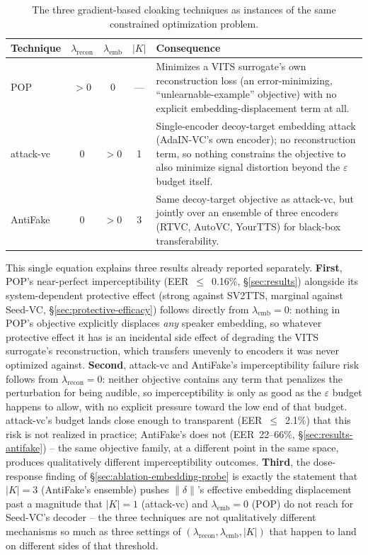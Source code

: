 \documentclass[11pt]{article}
\begin{document}
\begin{table}[H]
\centering
\caption{The three gradient-based cloaking techniques as instances of
the same constrained optimization problem.}
\label{tab:framework-cloaks}
\begin{tabular}{lccc p{4.3cm}}
\toprule
Technique & $\lambda_{\mathrm{recon}}$ & $\lambda_{\mathrm{emb}}$ & $|K|$ & Consequence \\
\midrule
POP       & $>0$ & $0$ & --- & Minimizes a VITS surrogate's own
  reconstruction loss (an error-minimizing, ``unlearnable-example''
  objective) with no explicit embedding-displacement term at all. \\
attack-vc & $0$   & $>0$ & 1 & Single-encoder decoy-target embedding
  attack (AdaIN-VC's own encoder); no reconstruction term, so nothing
  constrains the objective to also minimize signal distortion beyond
  the $\varepsilon$ budget itself. \\
AntiFake  & $0$   & $>0$ & 3 & Same decoy-target objective as
  attack-vc, but jointly over an ensemble of three encoders (RTVC,
  AutoVC, YourTTS) for black-box transferability. \\
\bottomrule
\end{tabular}
\end{table}

This single equation explains three results already reported
separately. \textbf{First}, POP's near-perfect imperceptibility
(EER~$\leq$~0.16\%, \S\ref{sec:results}) alongside its
system-dependent protective effect (strong against SV2TTS, marginal
against Seed-VC, \S\ref{sec:protective-efficacy}) follows directly
from $\lambda_{\mathrm{emb}}=0$: nothing in POP's objective explicitly
displaces \emph{any} speaker embedding, so whatever protective effect
it has is an incidental side effect of degrading the VITS surrogate's
reconstruction, which transfers unevenly to encoders it was never
optimized against. \textbf{Second}, attack-vc and AntiFake's
imperceptibility failure risk follows from $\lambda_{\mathrm{recon}}=0$:
neither objective contains any term that penalizes the perturbation
for being audible, so imperceptibility is only as good as the
$\varepsilon$ budget happens to allow, with no explicit pressure toward
the low end of that budget. attack-vc's budget lands close enough to
transparent (EER~$\leq$~2.1\%) that this risk is not realized in
practice; AntiFake's does not (EER~22--66\%,
\S\ref{sec:results-antifake}) -- the same objective family, at a
different point in the same space, produces qualitatively different
imperceptibility outcomes. \textbf{Third}, the dose-response finding of
\S\ref{sec:ablation-embedding-probe} is exactly the statement that
$|K|=3$ (AntiFake's ensemble) pushes $\|\delta\|$'s effective embedding
displacement past a magnitude that $|K|=1$ (attack-vc) and
$\lambda_{\mathrm{emb}}=0$ (POP) do not reach for Seed-VC's decoder --
the three techniques are not qualitatively different mechanisms so much
as three settings of $(\lambda_{\mathrm{recon}}, \lambda_{\mathrm{emb}}, |K|)$
that happen to land on different sides of that threshold.
\end{document}
